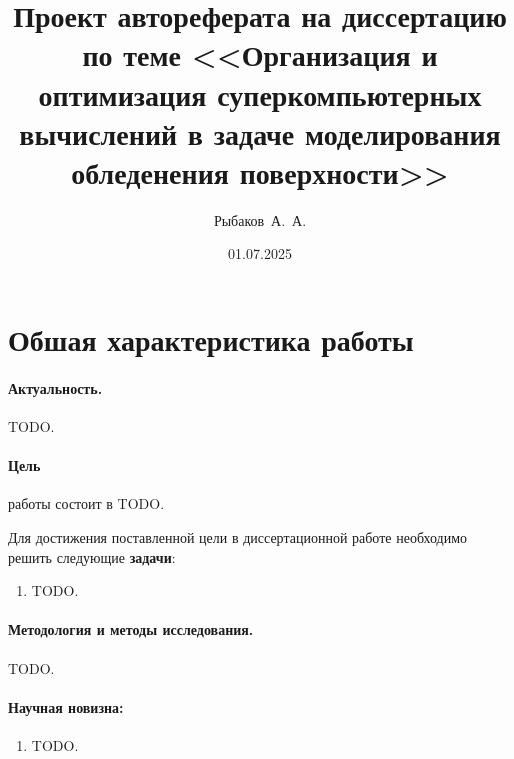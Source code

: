 \documentclass[a4paper,14pt]{extarticle}                     %
\theoremstyle{plain}                                         %
\begin{document}

\title{Проект автореферата на диссертацию по теме <<Организация и оптимизация суперкомпьютерных вычислений в задаче моделирования обледенения поверхности>>}
\author{Рыбаков~А.~А.}
\date{01.07.2025}
\maketitle
\thispagestyle{empty}                                        %


\newpage
\section*{Обшая характеристика работы}

\paragraph{Актуальность.} TODO.

\paragraph{Цель} работы состоит в TODO.

Для достижения поставленной цели в диссертационной работе необходимо решить следующие \textbf{задачи}:
\begin{enumerate}
\item TODO.
\end{enumerate}

\paragraph{Методология и методы исследования.} TODO.

\paragraph{Научная новизна:}
\begin{enumerate}
\item TODO.
\end{enumerate}
\end{document}
